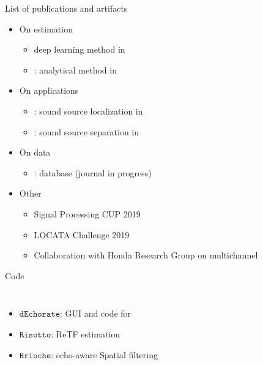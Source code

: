 \begin{frame}{List of publications and artifacts}
    \begin{itemize}
        \item On estimation
        \begin{itemize}\small
            \item deep learning method in~\cite{di2019mirage}
            \item \blaster: analytical method in~\cite{di2020blaster}
        \end{itemize}
        \item On applications
        \begin{itemize}\small
            \item \mirage: sound source localization in~\cite{di2019mirage}
            \item \separake: sound source separation in~\cite{scheibler2018separake}
        \end{itemize}
        \item On data
        \begin{itemize}\small
            \item \dechorate: database (journal in progress)
        \end{itemize}
        \item Other
        \begin{itemize}\small
            \item Signal Processing CUP 2019 \cite{deleforge2019audio}
            \item LOCATA Challenge 2019 \cite{lebarbenchon2018evaluation}
            \item Collaboration with Honda Research Group on multichannel \mirage
        \end{itemize}
    \end{itemize}

    \vspace{-2mm}
    \begin{block}{Code}
        \begin{columns}[T,onlytextwidth]
            \begin{itemize}\small
                \item $\mathtt{dEchorate}$: GUI and code for \dechorate
                \item $\mathtt{Risotto}$: ReTF estimation
                \item $\mathtt{Brioche}$: echo-aware Spatial filtering
            \end{itemize}


\end{columns}
\end{block}
\end{frame}
